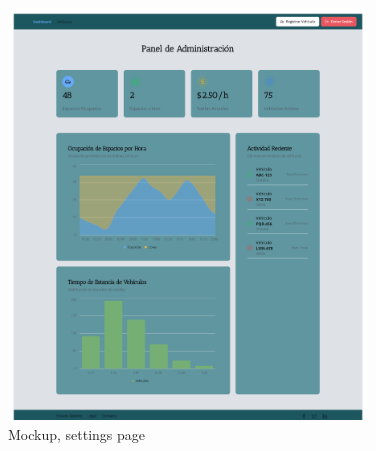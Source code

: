 \begin{figure}[h!]
    \centering
    \includegraphics[width=0.85\textwidth]{Mockups/mkup-3.png}
    \caption{Mockup, settings page}
    \label{fig:mkup-3}
\end{figure}
